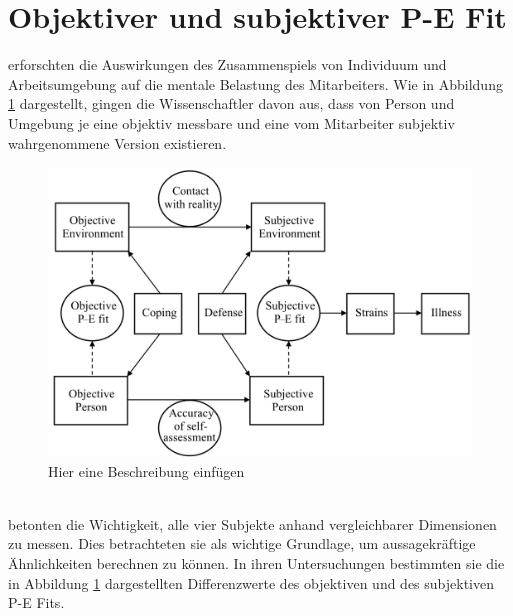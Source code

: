 \section{Objektiver und subjektiver P-E Fit}
\label{ch:personEnvironmentFit:subjektivObjektiv}
\textcite{copingAndAdaption:1974} erforschten die Auswirkungen des Zusammenspiels von Individuum und Arbeitsumgebung auf die mentale Belastung des Mitarbeiters. Wie in Abbildung \ref{fig:personEnvironmentFit:subjektivObjektiv:abb1} dargestellt, gingen die Wissenschaftler davon aus, dass von Person und Umgebung je eine objektiv messbare und eine vom Mitarbeiter subjektiv wahrgenommene Version existieren. \\
\begin{figure}[h]
	\centering
	\includegraphics[width=1\textwidth]{gfx/subjektivObjektivPEFit.png}
	\caption{Hier eine Beschreibung einfügen \cite[S. 22]{edwards:2008}}
	\label{fig:personEnvironmentFit:subjektivObjektiv:abb1}
\end{figure}\\
\textcite{copingAndAdaption:1974} betonten die Wichtigkeit, alle vier Subjekte anhand vergleichbarer Dimensionen zu messen. Dies betrachteten sie als wichtige Grundlage, um aussagekräftige Ähnlichkeiten berechnen zu können. In ihren Untersuchungen bestimmten sie die in Abbildung \ref{fig:personEnvironmentFit:subjektivObjektiv:abb1} dargestellten Differenzwerte des objektiven und des subjektiven P-E Fits.\\
